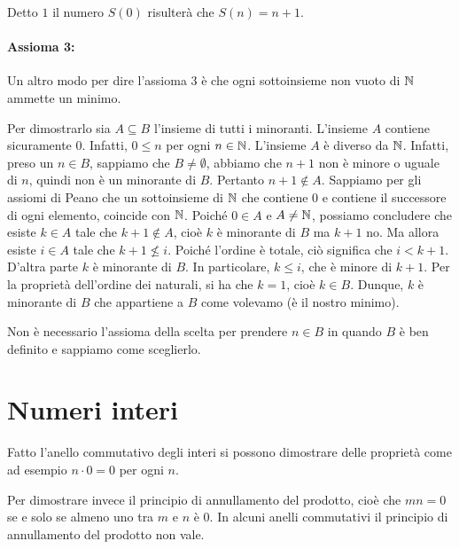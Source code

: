 \documentclass[a4paper]{article}
\begin{document}
Detto \(1\) il numero \(S(0)\) risulterà che \(S(n) = n+1\).

\paragraph{Assioma 3:}

\begin{snippetproposition}{}
    Un altro modo per dire l'assioma 3 è che ogni sottoinsieme non vuoto di \(\mathbb{N}\)
    ammette un minimo.
\end{snippetproposition}

\begin{snippetproof}{}
    Per dimostrarlo sia \(A\subseteq B\) l'insieme di tutti i minoranti.
    L'insieme \(A\) contiene sicuramente \(0\). Infatti, \(0 \leq n\) per ogni \(n\in\mathbb{N}\).
    L'insieme \(A\) è diverso da \(\mathbb{N}\). Infatti, preso un \(n \in B\),
    sappiamo che \(B \neq \emptyset\), abbiamo che \(n+1\) non è minore o uguale di \(n\),
    quindi non è un minorante di \(B\). Pertanto \(n+1 \notin A\).
    Sappiamo per gli assiomi di Peano che un sottoinsieme di \(\mathbb{N}\) che contiene \(0\)
    e contiene il successore di ogni elemento, coincide con \(\mathbb{N}\).
    Poiché \(0\in A\) e \(A\neq \mathbb{N}\), possiamo concludere che esiste \(k\in A\)
    tale che \(k+1 \notin A\), cioè \(k\) è minorante di \(B\) ma \(k+1\) no.
    Ma allora esiste \(i \in A\) tale che \(k+1 \not\leq i\).
    Poiché l'ordine è totale, ciò significa che \(i < k+1\). D'altra parte
    \(k\) è minorante di \(B\). In particolare, \(k \leq i\), che è minore di \(k+1\).
    Per la proprietà dell'ordine dei naturali, si ha che \(k=1\), cioè \(k\in B\).
    Dunque, \(k\) è minorante di \(B\) che appartiene a \(B\) come volevamo (è il nostro minimo).
\end{snippetproof}

Non è necessario l'assioma della scelta per prendere \(n\in B\)
in quando \(B\) è ben definito e sappiamo come sceglierlo.

\section{Numeri interi}

Fatto l'anello commutativo degli interi si possono dimostrare delle proprietà come ad esempio
\(n\cdot0 = 0\) per ogni \(n\).

Per dimostrare invece il principio di annullamento del prodotto, cioè che \(mn=0\)
se e solo se almeno uno tra \(m\) e \(n\) è \(0\).
In alcuni anelli commutativi il principio di annullamento del prodotto non vale.
\end{document}
